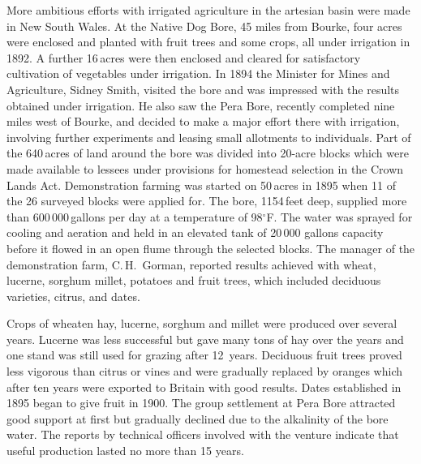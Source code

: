 More ambitious efforts with irrigated agriculture in the artesian
basin were made in New South Wales.  At the Native Dog Bore,
 45 miles from Bourke,  four
acres were enclosed and planted with fruit trees and some
crops, all under irrigation in 1892.  A further 16\,acres were then
enclosed and cleared for satisfactory cultivation of vegetables under
irrigation.  In 1894 the Minister for Mines and Agriculture, Sidney
Smith,  visited the bore and was impressed with the
results obtained under irrigation.  He also saw the Pera Bore,
 recently completed nine miles west of Bourke, and
decided to make a major effort there with irrigation, involving
further experiments and leasing small allotments to individuals.  Part
of the 640\,acres of land around the bore was divided into 20-acre
blocks which were made available to lessees under provisions for
homestead selection in the Crown Lands Act. Demonstration farming was
started on 50\,acres in 1895 when 11 of the 26 surveyed blocks were
applied for. The bore, 1154\,feet deep, supplied more than
600\,000\,gallons per day at a temperature of 98$^\circ$F.  The water
was sprayed for cooling and aeration and held in an elevated tank of
20\,000 gallons capacity before it flowed in an open flume through the
selected blocks.  The manager of the demonstration farm,
C.\,H.~Gorman,   reported results achieved with
wheat, lucerne, sorghum millet, potatoes
and fruit trees, which included deciduous varieties,
citrus, and dates.

Crops of wheaten hay, lucerne, sorghum and millet were
produced over several years.  Lucerne was less successful but gave
many tons of hay over the years and one stand was still used for
grazing after 12~years.  Deciduous fruit trees proved
less vigorous than citrus or vines and were gradually
replaced by oranges which after ten years were exported to
Britain with good results.  Dates established in 1895
began to give fruit in 1900.  The group settlement at Pera Bore
attracted good support at first but gradually declined due to the
alkalinity  of the bore water. The reports by
technical officers involved with the venture indicate that useful
production lasted no more than 15 years.


